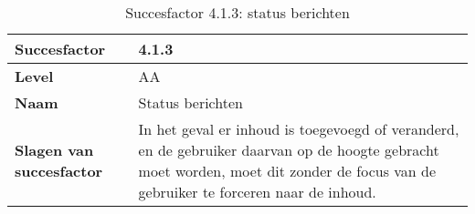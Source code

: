 \begin{table}[H]
    \centering
    \caption{Succesfactor 4.1.3: status berichten}
    
    
    \hspace*{-1cm}\begin{tabular}{|l|p{12cm}|} 
        \hline
        \textbf{Succesfactor}                 & 4.1.3                                                                                                                                                                                                                                                                                                                                                                                                                                                                                                       \\ 
        \hline
        \textbf{Level}                        & AA                                                                                                                                                                                                                                                                                                                                                                                                                                                                                                               \\ 
        \hline
        \textbf{Naam}                         & Status berichten~                                                                                                                                                                                                                                                                                                                                                                                                                                                                                      \\ 
        \hline
        \textbf{Slagen van succesfactor}      & In het geval er inhoud is toegevoegd of veranderd, en de gebruiker daarvan op de hoogte gebracht moet worden, moet dit zonder de focus van de gebruiker te forceren naar de inhoud.
        \\  
        

\end{tabular}
\end{table}
